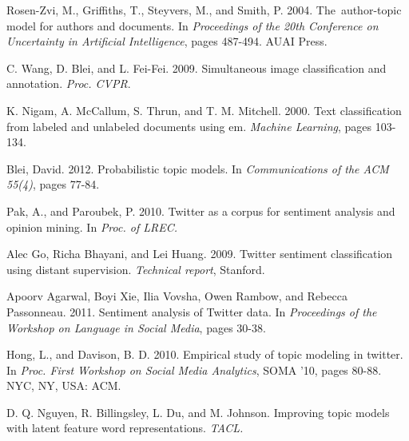 \documentclass[12pt]{amsart}
\newcommand{\0}{\mat{0}}
\newcommand{\1}{\mathds{1}}
\begin{document}
\begin{thebibliography}{1}
	
	  Rosen-Zvi, M., Griffiths, T., Steyvers, M., and Smith, P. 2004. The author-topic model for authors and documents. In \emph{Proceedings of the 20th Conference on Uncertainty in Artificial Intelligence}, pages 487-494. AUAI Press.\smallskip
	
	 C. Wang, D. Blei, and L. Fei-Fei. 2009. Simultaneous image classification and annotation. \emph{Proc. CVPR}. \smallskip
	
	 K. Nigam, A. McCallum, S. Thrun, and T. M. Mitchell. 2000. Text classification from labeled and unlabeled documents using em. \emph{Machine Learning}, pages 103-134. \smallskip
	
	 Blei, David. 2012. Probabilistic topic models. In \emph{Communications of the ACM 55(4)}, pages 77-84.\smallskip
	
	 Pak, A., and Paroubek, P. 2010. Twitter as a corpus for sentiment analysis and opinion mining. In \emph{Proc. of LREC.}\smallskip
	
	 Alec Go, Richa Bhayani, and Lei Huang. 2009. Twitter sentiment classification using distant supervision. \emph{Technical report}, Stanford.\smallskip
	
	 Apoorv Agarwal, Boyi Xie, Ilia Vovsha, Owen Rambow, and Rebecca Passonneau. 2011. Sentiment analysis of Twitter data. In \emph{Proceedings of the Workshop on Language in Social Media}, pages 30-38.\smallskip
	
	 Hong, L., and Davison, B. D. 2010. Empirical study of topic modeling in twitter. In \emph{Proc. First Workshop on Social Media Analytics}, SOMA ’10, pages 80-88. NYC, NY, USA: ACM.\smallskip
	
	 D. Q. Nguyen, R. Billingsley, L. Du, and M. Johnson. Improving topic models with latent feature word representations. \emph{TACL.} \smallskip
	
\end{thebibliography}
\end{document}
